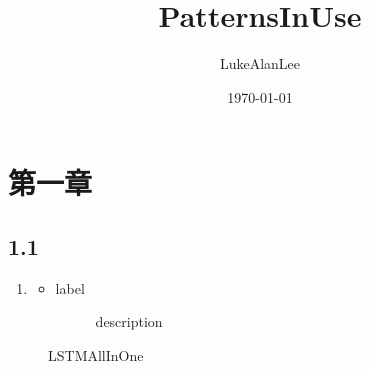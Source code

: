 \documentclass[UTF8]{article}%
\title{\heiti PatternsInUse}
\author{\kaishu LukeAlanLee}
\date{\today}
\begin{document}
	\maketitle %
	\tableofcontents
	\newpage
	\section{第一章}
		\subsection{1.1}
			\begin{enumerate}
				\item 
				\begin{itemize}
					\item 
					\begin{description}
						\item[label] description
					\end{description}
				\end{itemize}
			\end{enumerate}
			\begin{figure}[H]
				\centering
				\noindent{}
				\caption{LSTMAllInOne}  %
				\label{LSTMAllInOne}   %
			\end{figure}
		
\end{document}
